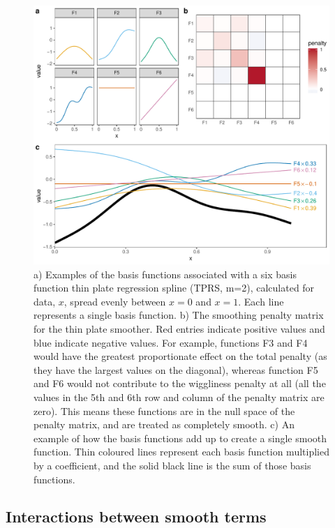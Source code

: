 \documentclass[12pt]{article}
\begin{document}
\begin{figure}
\includegraphics[width=\linewidth]{../figures/Fig3} \caption{\label{fig:Fib3}a) Examples of the basis functions associated with a six basis function thin plate regression spline (TPRS, m=2), calculated for data, $x$, spread evenly between $x=0$ and $x=1$. Each line represents a single basis function. b) The smoothing  penalty matrix for the thin plate smoother. Red entries indicate positive values and blue indicate negative values.  For example, functions F3 and F4 would have the greatest proportionate effect on the total penalty (as they have the largest values on the diagonal), whereas function F5 and F6 would not contribute to the wiggliness penalty at all (all the values in the 5th and 6th row and column of the penalty matrix are zero). This means these functions are in the null space of the penalty matrix, and are treated as completely smooth. c) An example of how the basis functions add up to create a single smooth function. Thin coloured lines represent each basis function multiplied by a coefficient, and the solid black line is the sum of those basis functions.}\label{fig:Fig3}
\end{figure}

\subsection{Interactions between smooth
terms}\label{interactions-between-smooth-terms}
\end{document}
